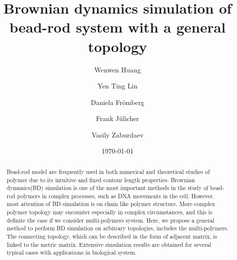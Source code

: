 \documentclass[preprint,aps,draft]{revtex4}
\begin{document}
\title{Brownian dynamics simulation of bead-rod system with a general topology}

\author{Wenwen Huang}
\author{Yen Ting Lin}
\author{Daniela Fr\"{o}mberg}
\author{Frank J\"{u}licher}
\author{Vasily Zaburdaev}
\date{\today}

\begin{abstract}

Bead-rod model are frequently used in both numerical and theoretical studies of polymer due to its intuitive and fixed contour length properties.
Brownian dynamics(BD) simulation is one of the most important methods in the study of bead-rod polymers in complex processes, such as DNA movements in the cell. 
However, most attention of BD simulation is on chain like polymer structure.
More complex polymer topology may encounter especially in complex circumstances, and this is definite the case if we consider multi-polymers system.
Here, we propose a general method to perform BD simulation on arbitrary topologies, includes the multi-polymers.
The connecting topology, which can be described in the form of adjacent matrix, is linked to the metric matrix.
Extensive simulation results are obtained for several typical cases with applications in biological system.

\end{abstract}
\maketitle
\end{document}
